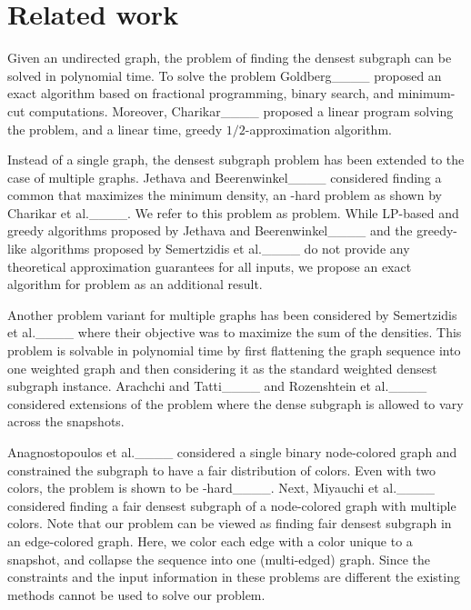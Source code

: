 \section{Related work}
\label{sec:related}

Given an undirected graph, the problem of finding the densest subgraph can be solved in polynomial time. To solve the problem Goldberg____ proposed
an exact algorithm based on fractional programming, binary search, and minimum-cut computations. Moreover, Charikar____ proposed a linear program solving the problem, and a linear time, greedy $1/2$-approximation algorithm.

Instead of a single graph, the densest subgraph problem has been extended to the case of multiple graphs.
Jethava and Beerenwinkel____ considered finding a common that maximizes the minimum density, an \np-hard problem as shown by Charikar et al.____.
We refer to this problem as \problemdcs problem. 
While LP-based and greedy algorithms proposed by Jethava and Beerenwinkel____ and the greedy-like algorithms proposed by Semertzidis et al.____  do not provide any theoretical approximation guarantees for all inputs, we propose an exact algorithm for \problemdcs problem as an additional result.

 Another problem variant for multiple graphs has been considered by Semertzidis et al.____ where their objective was to maximize the sum of the densities. This problem is solvable in polynomial time by first flattening the graph sequence into one weighted graph and then considering it as the standard weighted densest subgraph instance. Arachchi and Tatti____ and Rozenshtein et al.____ considered extensions of the problem where the dense subgraph is allowed to vary across the snapshots.
 

Anagnostopoulos et al.____ considered a single binary node-colored graph and constrained the subgraph to have a fair distribution of colors.
Even with two colors, the problem is shown to be \np-hard____.
Next, Miyauchi et al.____ considered finding a fair densest subgraph of a node-colored graph with multiple colors.
Note that our problem can be viewed as finding fair densest subgraph in an edge-colored graph. Here, we color each edge with a color unique to a snapshot, and collapse the sequence into one (multi-edged) graph. Since the constraints and the input information in these problems are different the existing methods cannot be used to solve our problem.


